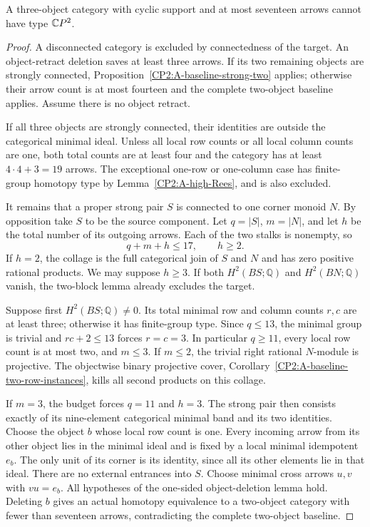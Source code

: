 \begin{theorem}
\label{CP2:A-strong-three-seventeen}
A three-object category with cyclic support and at most
seventeen arrows cannot have type $\mathbb{C}P^2$.
\end{theorem}
\begin{proof}
A disconnected category is excluded by connectedness of
the target. An object-retract deletion saves at least
three arrows. If its two remaining objects are strongly
connected, Proposition~\ref{CP2:A-baseline-strong-two}
applies; otherwise their arrow count is at most fourteen
and the complete two-object baseline applies. Assume
there is no object retract.

If all three objects are strongly connected, their
identities are outside the categorical minimal ideal.
Unless all local row counts or all local column counts
are one, both total counts are at least four and the
category has at least $4\cdot4+3=19$ arrows. The exceptional
one-row or one-column case has finite-group homotopy type
by Lemma~\ref{CP2:A-high-Rees}, and is also excluded.

It remains that a proper strong pair $S$ is connected
to one corner monoid $N$. By opposition take $S$ to be
the source component. Let $q=|S|$, $m=|N|$, and let $h$
be the total number of its outgoing arrows. Each of the
two stalks is nonempty, so
\[
 q+m+h\le17,\qquad h\ge2.
\]
If $h=2$, the collage is the full categorical join of
$S$ and $N$ and has zero positive rational products.
We may suppose $h\ge3$. If both $H^2(BS;\mathbb Q)$
and $H^2(BN;\mathbb Q)$ vanish, the two-block lemma
already excludes the target.

Suppose first $H^2(BS;\mathbb Q)\ne0$. Its total minimal
row and column counts $r,c$ are at least three; otherwise
it has finite-group type. Since $q\le13$, the minimal
group is trivial and $rc+2\le13$ forces $r=c=3$.
In particular $q\ge11$, every local row count is at most
two, and $m\le3$. If $m\le2$, the trivial right rational
$N$-module is projective. The objectwise binary projective
cover, Corollary~\ref{CP2:A-baseline-two-row-instances},
kills all second products on this collage.

If $m=3$, the budget forces $q=11$ and $h=3$. The strong
pair then consists exactly of its nine-element categorical
minimal band and its two identities. Choose the object
$b$ whose local row count is one. Every incoming arrow
from its other object lies in the minimal ideal and is
fixed by a local minimal idempotent $e_b$. The only unit
of its corner is its identity, since all its other elements
lie in that ideal. There are no external entrances into
$S$. Choose minimal cross arrows $u,v$ with $vu=e_b$.
All hypotheses of the one-sided object-deletion lemma
hold. Deleting $b$ gives an actual homotopy equivalence
to a two-object category with fewer than seventeen arrows,
contradicting the complete two-object baseline.


\end{proof}
